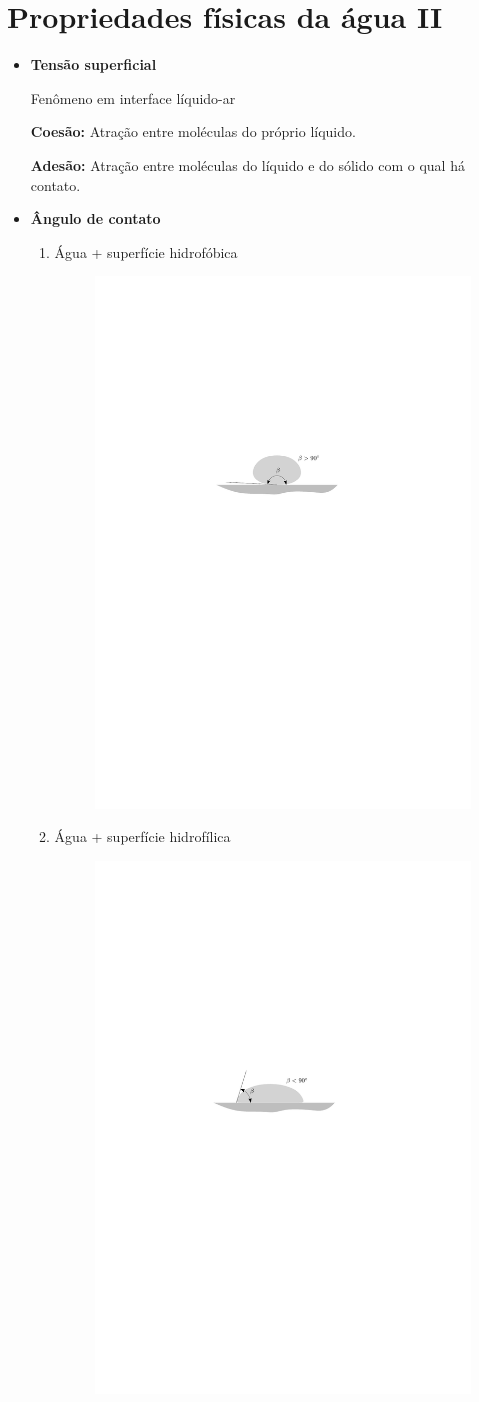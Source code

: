 \documentclass[
	a4paper, 
	12pt, 
	brazilian
]{article}
\begin{document}
	\section{Propriedades físicas da água II}
	\begin{itemize}
		\item\textbf{Tensão superficial}
		
		Fenômeno em interface líquido-ar
		
		\textbf{Coesão:} Atração entre moléculas do próprio líquido.
		
		\textbf{Adesão:} Atração entre moléculas do líquido e do sólido com o qual há contato.
		
		\item\textbf{Ângulo de contato}
		\begin{enumerate}
			\item Água + superfície hidrofóbica
			\begin{figure}[H]
				\centering
				\includegraphics[width=0.5\linewidth]{assets/images/agua_superficie_hidrofobica}
				\label{fig:aguasuperficiehidrofobica}
			\end{figure}
			\item Água + superfície hidrofílica
			\begin{figure}[H]
				\centering
				\includegraphics[width=0.5\linewidth]{assets/images/agua_superficie_hidrofilica}
				\label{fig:aguasuperficiehidrofilica}
			\end{figure}
			

\end{enumerate}
\end{itemize}
\end{document}
